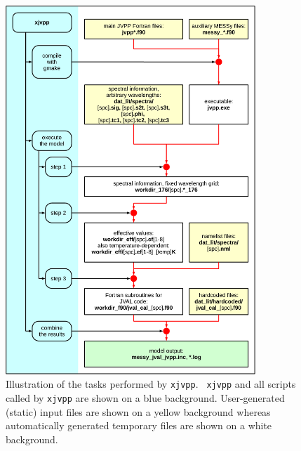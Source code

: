 \documentclass[a4paper,twoside]{article}
\begin{document}
\begin{figure}[tbh]
  \begin{center}
  \includegraphics[width=0.84\textwidth]{flowcontrol_xjvpp}
  \end{center}
  \caption{Illustration of the tasks performed by {\tt xjvpp}. {\tt
      xjvpp} and all scripts called by {\tt xjvpp} are shown on a blue
    background. User-generated (static) input files are shown on a
    yellow background whereas automatically generated temporary files
    are shown on a white background.}
  \label{fig:flowcontrol_xjvpp}
\end{figure}
\end{document}
